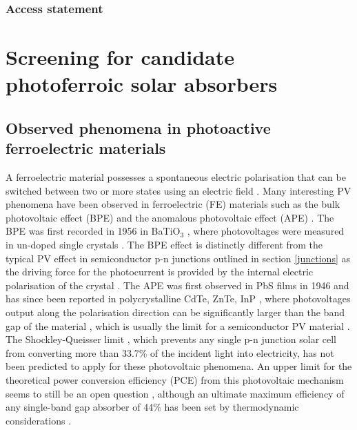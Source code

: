 \documentclass[11pt, twoside]{report}
\begin{document}
\subsection{Access statement}


\chapter{Screening for candidate photoferroic solar absorbers}\label{chap:screening}

\section{Observed phenomena in photoactive ferroelectric materials}\label{ferroPVsection}
A ferroelectric material possesses a spontaneous electric polarisation that can be switched between two or more states using an electric field \cite{new_FE_PV_1}. Many interesting PV phenomena have been observed in ferroelectric (FE) materials such as the bulk photovoltaic effect (BPE) and the anomalous photovoltaic effect (APE) \cite{keith}. 
The BPE was first recorded in 1956 in BaTiO$_3$ \cite{keith_46}, where photovoltages were measured in un-doped single crystals \cite{keith}.
The BPE effect is distinctly different from the typical PV effect in semiconductor
p-n junctions outlined in section \ref{junctions} as the driving force for the photocurrent is provided by the internal electric polarisation of the crystal \cite{FE_PV_rev1}. 
The APE was first observed in PbS films in 1946 \cite{keith_54} and has since been reported in polycrystalline CdTe, ZnTe, InP \cite{keith_55, keith_56, keith_57}, where photovoltages output along the polarisation direction can be significantly larger than the band gap of the material \cite{FE_PV_rev1}, which is usually the limit for a semiconductor PV material \cite{keith}. 
The Shockley-Queisser limit \cite{SQ_1961}, which prevents any single p-n junction solar cell from converting more than 33.7\% of the incident light into electricity, has not been predicted to apply for these photovoltaic phenomena. An upper limit for the theoretical power conversion efficiency (PCE) from this photovoltaic mechanism seems to still be an open question \cite{ FE-PV_kirchartz, new_FE_PV}, although an ultimate maximum efficiency of any single-band gap absorber of 44\% has been set by thermodynamic considerations \cite{SQ_1961}. 
\end{document}

